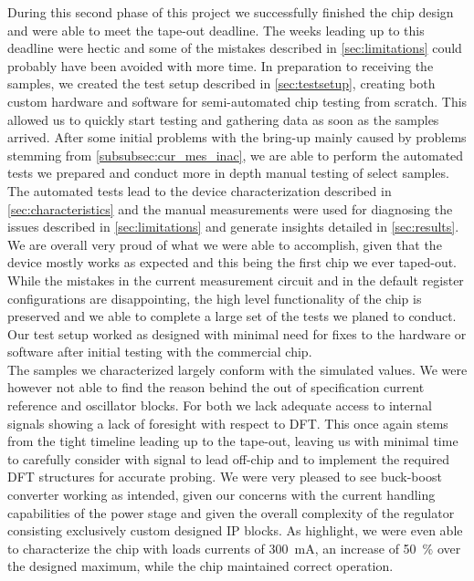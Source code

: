 During this second phase of this project we successfully finished the chip design and were able to meet the tape-out deadline. The weeks leading up to this deadline were hectic and some of the mistakes described in \autoref{sec:limitations} could probably have been avoided with more time. In preparation to receiving the samples, we created the test setup described in \autoref{sec:testsetup}, creating both custom hardware and software for semi-automated chip testing from scratch. This allowed us to quickly start testing and gathering data as soon as the samples arrived. After some initial problems with the bring-up mainly caused by problems stemming from \autoref{subsubsec:cur_mes_inac}, we are able to perform the automated tests we prepared and conduct more in depth manual testing of select samples. The automated tests lead to the device characterization described in \autoref{sec:characteristics} and the manual measurements were used for diagnosing the issues described in \autoref{sec:limitations} and generate insights detailed in \autoref{sec:results}. \\

We are overall very proud of what we were able to accomplish, given that the device mostly works as expected and this being the first chip we ever taped-out. While the mistakes in the current measurement circuit and in the default register configurations are disappointing, the high level functionality of the chip is preserved and we able to complete a large set of the tests we planed to conduct. Our test setup worked as designed with minimal need for fixes to the hardware or software after initial testing with the commercial chip. \\

The samples we characterized largely conform with the simulated values. We were however not able to find the reason behind the out of specification current reference and oscillator blocks. For both we lack adequate access to internal signals showing a lack of foresight with respect to \ac{DFT}. This once again stems from the tight timeline leading up to the tape-out, leaving us with minimal time to carefully consider with signal to lead off-chip and to implement the required \ac{DFT} structures for accurate probing. We were very pleased to see buck-boost converter working as intended, given our concerns with the current handling capabilities of the power stage and given the overall complexity of the regulator consisting exclusively custom designed IP blocks. As highlight, we were even able to characterize the chip with loads currents of \qty{300}{\milli\ampere}, an increase of \qty{50}{\percent} over the designed maximum, while the chip maintained correct operation. 






\clearpage
